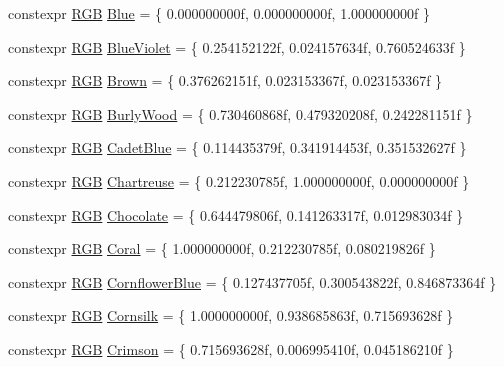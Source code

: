\begin{DoxyCompactItemize}
\item 
constexpr \mbox{\hyperlink{structmage_1_1_r_g_b}{R\+GB}} \mbox{\hyperlink{namespacemage_1_1color_af2a2acff5b9725eb57bef7dc4822892b}{Blue}} = \{ 0.\+000000000f, 0.\+000000000f, 1.\+000000000f \}
\item 
constexpr \mbox{\hyperlink{structmage_1_1_r_g_b}{R\+GB}} \mbox{\hyperlink{namespacemage_1_1color_a456981fe1885b8347622a2b63fc27fe0}{Blue\+Violet}} = \{ 0.\+254152122f, 0.\+024157634f, 0.\+760524633f \}
\item 
constexpr \mbox{\hyperlink{structmage_1_1_r_g_b}{R\+GB}} \mbox{\hyperlink{namespacemage_1_1color_ae17f4f7f2abb3b569dcda75a56a6e0fc}{Brown}} = \{ 0.\+376262151f, 0.\+023153367f, 0.\+023153367f \}
\item 
constexpr \mbox{\hyperlink{structmage_1_1_r_g_b}{R\+GB}} \mbox{\hyperlink{namespacemage_1_1color_ad61a0cb85a0718f107d24a9ccb14f7a9}{Burly\+Wood}} = \{ 0.\+730460868f, 0.\+479320208f, 0.\+242281151f \}
\item 
constexpr \mbox{\hyperlink{structmage_1_1_r_g_b}{R\+GB}} \mbox{\hyperlink{namespacemage_1_1color_a9db1c95bad4c8f3a056b2b1b09bd1e90}{Cadet\+Blue}} = \{ 0.\+114435379f, 0.\+341914453f, 0.\+351532627f \}
\item 
constexpr \mbox{\hyperlink{structmage_1_1_r_g_b}{R\+GB}} \mbox{\hyperlink{namespacemage_1_1color_a4d4898d5a83df8e62ac4d1062771f710}{Chartreuse}} = \{ 0.\+212230785f, 1.\+000000000f, 0.\+000000000f \}
\item 
constexpr \mbox{\hyperlink{structmage_1_1_r_g_b}{R\+GB}} \mbox{\hyperlink{namespacemage_1_1color_a19707250aad8c877717355fac97779d6}{Chocolate}} = \{ 0.\+644479806f, 0.\+141263317f, 0.\+012983034f \}
\item 
constexpr \mbox{\hyperlink{structmage_1_1_r_g_b}{R\+GB}} \mbox{\hyperlink{namespacemage_1_1color_a01bc4f2d453366cf9af890f0abb94738}{Coral}} = \{ 1.\+000000000f, 0.\+212230785f, 0.\+080219826f \}
\item 
constexpr \mbox{\hyperlink{structmage_1_1_r_g_b}{R\+GB}} \mbox{\hyperlink{namespacemage_1_1color_a6b4ca119db23d03d1c5bc912c87b6348}{Cornflower\+Blue}} = \{ 0.\+127437705f, 0.\+300543822f, 0.\+846873364f \}
\item 
constexpr \mbox{\hyperlink{structmage_1_1_r_g_b}{R\+GB}} \mbox{\hyperlink{namespacemage_1_1color_ace73c8ed652093ab4cce3af40a8efe1a}{Cornsilk}} = \{ 1.\+000000000f, 0.\+938685863f, 0.\+715693628f \}
\item 
constexpr \mbox{\hyperlink{structmage_1_1_r_g_b}{R\+GB}} \mbox{\hyperlink{namespacemage_1_1color_a3855cb93401fa7336108eac1f9b8c0c7}{Crimson}} = \{ 0.\+715693628f, 0.\+006995410f, 0.\+045186210f \}

\end{DoxyCompactItemize}
